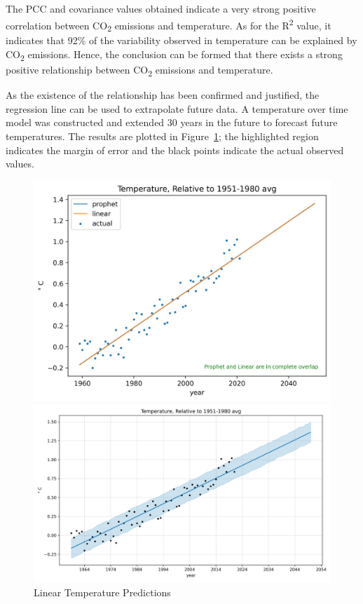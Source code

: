 \documentclass[12pt]{mcmthesis}
\begin{document}
    The PCC and covariance values obtained indicate a very strong positive correlation between CO\textsubscript{2} emissions and temperature. As for the R\textsuperscript{2} value, it indicates that 92\% of the variability observed in temperature can be explained by CO\textsubscript{2} emissions. Hence, the conclusion can be formed that there exists a strong positive relationship between CO\textsubscript{2} emissions and temperature.

    As the existence of the relationship has been confirmed and justified, the regression line can be used to extrapolate future data. A temperature over time model was constructed and extended 30 years in the future to forecast future temperatures. The results are plotted in Figure~\ref{fig:temp_pred}; the highlighted region indicates the margin of error and the black points indicate the actual observed values.

    \begin{figure}[h]
        \centering
        \begin{minipage}{0.45\linewidth}
            \centering
            \includegraphics[width=\textwidth]{temp_pred}
        \end{minipage}%
        \begin{minipage}{0.55\linewidth}
            \centering
            \includegraphics[width=\textwidth]{temp_prophet}
        \end{minipage}
        \caption{Linear Temperature Predictions}
        \label{fig:temp_pred}
    \end{figure}
\end{document}
